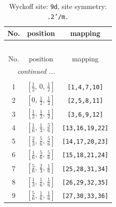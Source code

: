 \documentclass[fleqn,8pt]{jsarticle}
\begin{document}
\begin{longtable}{ccc}
\caption{Wyckoff site: {\tt 9d}, site symmetry: {\tt .2'/m.}}
 \\
 \hline \hline
No. & position & mapping \\ \hline \endfirsthead

\multicolumn{2}{l}{\tablename\ \thetable{}} \\
 \hline \hline
No. & position & mapping \\ \hline \endhead

 \hline \hline
\multicolumn{2}{r}{\footnotesize\it continued ...} \\ \endfoot

 \hline \hline
\multicolumn{2}{r}{} \\ \endlastfoot

1 & $\left[ \frac{1}{2},\, 0,\, \frac{1}{2} \right]$ & {\tt [1,4,7,10]} \\ \hline
2 & $\left[ 0,\, \frac{1}{2},\, \frac{1}{2} \right]$ & {\tt [2,5,8,11]} \\ \hline
3 & $\left[ \frac{1}{2},\, \frac{1}{2},\, \frac{1}{2} \right]$ & {\tt [3,6,9,12]} \\ \hline
4 & $\left[ \frac{1}{6},\, \frac{1}{3},\, \frac{5}{6} \right]$ & {\tt [13,16,19,22]} \\ \hline
5 & $\left[ \frac{2}{3},\, \frac{5}{6},\, \frac{5}{6} \right]$ & {\tt [14,17,20,23]} \\ \hline
6 & $\left[ \frac{1}{6},\, \frac{5}{6},\, \frac{5}{6} \right]$ & {\tt [15,18,21,24]} \\ \hline
7 & $\left[ \frac{5}{6},\, \frac{2}{3},\, \frac{1}{6} \right]$ & {\tt [25,28,31,34]} \\ \hline
8 & $\left[ \frac{1}{3},\, \frac{1}{6},\, \frac{1}{6} \right]$ & {\tt [26,29,32,35]} \\ \hline
9 & $\left[ \frac{5}{6},\, \frac{1}{6},\, \frac{1}{6} \right]$ & {\tt [27,30,33,36]} \\
\end{longtable}
\renewcommand{\arraystretch}{1.2}
\end{document}
